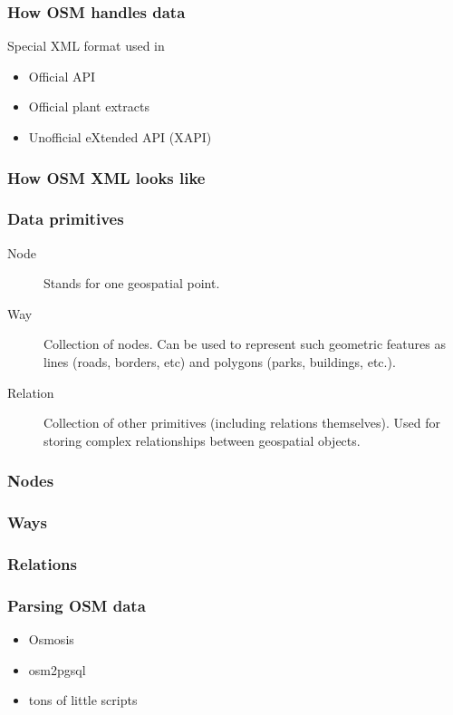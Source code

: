 \documentclass{beamer}
\begin{document}
\begin{frame}
  \frametitle{How OSM handles data}
  Special XML format used in
  \begin{itemize}
  \item Official API
  \item Official plant extracts
  \item Unofficial eXtended API (XAPI)
  \end{itemize}
\end{frame}

\begin{frame}[fragile]
  \frametitle{How OSM XML looks like}
  
\end{frame}

\begin{frame}
  \frametitle{Data primitives}
  \begin{description}
  \item[Node] Stands for one geospatial point.
  \item[Way] Collection of nodes. Can be used to represent
    such geometric features as lines (roads, borders, etc)
    and polygons (parks, buildings, etc.).
  \item[Relation] Collection of other primitives (including
    relations themselves). Used for storing complex
    relationships between geospatial objects.
  \end{description}
\end{frame}

\begin{frame}
  \frametitle{Nodes}
  
\end{frame}

\begin{frame}
  \frametitle{Ways}
  
\end{frame}

\begin{frame}
  \frametitle{Relations}
  
\end{frame}

\begin{frame}
  \frametitle{Parsing OSM data}
  \begin{itemize}
  \item Osmosis
  \item osm2pgsql
  \item tons of little scripts
  \end{itemize}
\end{frame}
\end{document}
